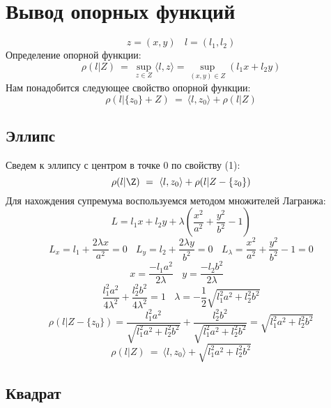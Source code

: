 \documentclass[11pt]{article}
\begin{document}
\section{Вывод опорных функций}
\[z = (x, y)~~~~ l = (l_1, l_2)\]
Определение опорной функции:
\[\rho(l|Z)~=~\sup_{z\in Z} \langle l, z \rangle = \sup_{(x, y)\in Z} (l_1 x + l_2 y)\]
\newline
Нам понадобится следующее свойство опорной функции:
\begin{equation} \label{eq1}
\rho(l|\{z_0\} + Z)~=~\langle l, z_0 \rangle + \rho(l | Z)
\end{equation}

\subsection{Эллипс}

Сведем к эллипсу с центром в точке 0 по свойству (1):
\[
\rho(l|\Z)~=~\langle l, z_0 \rangle + \rho(l | Z - \{z_0\})
\]
Для нахождения супремума воспользуемся методом множителей Лагранжа:
\[L = l_1 x + l_2 y + \lambda (\frac{x^2}{a^2} + \frac{y^2}{b^2}- 1)\]
\[L_x = l_1 + \frac{2 \lambda x}{a^2} = 0~~~~
L_y = l_2 + \frac{2 \lambda y}{b^2} = 0~~~~
L_\lambda = \frac{x^2}{a^2} + \frac{y^2}{b^2}- 1 = 0\]
\[x = \frac{-l_1 a^2}{2 \lambda}~~~~
y = \frac{-l_2 b^2}{2 \lambda}~~~~\]
\[\frac{l_1^2 a^2}{4 \lambda^2} + \frac{l_2^2 b^2}{4 \lambda^2} = 1~~~~
\lambda = -\frac{1}{2}\sqrt{l_1^2 a^2 + l_2^2 b^2}\]
\[\rho(l | Z - \{z_0\}) = \frac{l_1^2 a^2}{\sqrt{l_1^2 a^2 + l_2^2 b^2}} + \frac{l_2^2 b^2}{\sqrt{l_1^2 a^2 + l_2^2 b^2}} = \sqrt{l_1^2 a^2 + l_2^2 b^2}\]
\[\rho(l|Z)~=~\langle l, z_0 \rangle + \sqrt{l_1^2 a^2 + l_2^2 b^2}\]

\subsection{Квадрат}
\end{document}
